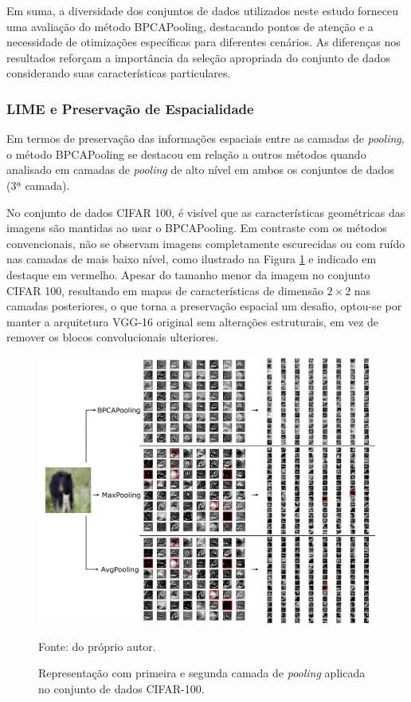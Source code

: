 Em suma, a diversidade dos conjuntos de dados utilizados neste estudo forneceu uma avaliação do método BPCAPooling, destacando pontos de atenção e a necessidade de otimizações específicas para diferentes cenários. As diferenças nos resultados reforçam a importância da seleção apropriada do conjunto de dados considerando suas características particulares.

\subsubsection{LIME e Preservação de Espacialidade}
\label{results:class:lime}
Em termos de preservação das informações espaciais entre as camadas de \textit{pooling}, o método BPCAPooling se destacou em relação a outros métodos quando analisado em camadas de \textit{pooling} de alto nível em ambos os conjuntos de dados (3ª camada).

No conjunto de dados CIFAR 100, é visível que as características geométricas das imagens são mantidas ao usar o BPCAPooling. Em contraste com os métodos convencionais, não se observam imagens completamente escurecidas ou com ruído nas camadas de mais baixo nível, como ilustrado na Figura \ref{results:fig:datasets:5} e indicado em destaque em vermelho. Apesar do tamanho menor da imagem no conjunto CIFAR 100, resultando em mapas de características de dimensão $2 \times 2$ nas camadas posteriores, o que torna a preservação espacial um desafio, optou-se por manter a arquitetura VGG-16 original sem alterações estruturais, em vez de remover os blocos convolucionais ulteriores.

\begin{figure}[H]
    \centering
    \caption[Camadas de \textit{pooling} no CIFAR-100]{Representação com primeira e segunda camada de \textit{pooling} aplicada no conjunto de dados CIFAR-100.}
    \label{results:fig:datasets:5}
    \includegraphics[width=1\textwidth]{recursos/imagens/results/cifar_blocks.png}

    Fonte: do próprio autor.
\end{figure}

